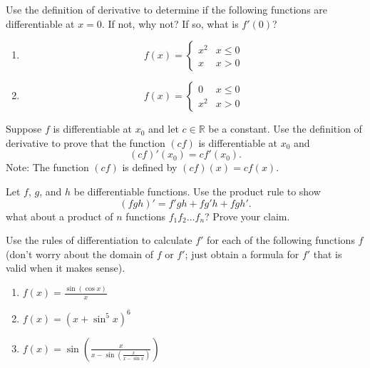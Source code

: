 \documentclass[12pt,letterpaper]{hmcpset}
\begin{document}

\begin{problem}[1]
  Use the definition of derivative to determine if the following functions are differentiable at
$x = 0$. If not, why not? If so, what is $f'(0)$?
\begin{enumerate}[label=(\alph*)]
\item \[ f(x) =
    \begin{cases}
      x^2 &x \leq 0 \\
      x   &x > 0
    \end{cases}
  \]
\item \[ f(x) =
    \begin{cases}
    0 &x \leq 0 \\
    x^2 &x > 0
    \end{cases}
    \]
\end{enumerate}
\end{problem}
\begin{solution}

\end{solution}
\pagebreak
\begin{problem}[2]
  Suppose $f$ is differentiable at $x_0$ and let $c\in\mathbb{R}$ be a constant. Use the definition of derivative to prove that the function $(cf)$ is differentiable at $x_0$ and
  \[ (cf)' (x_0) = cf'(x_0). \]
  Note: The function $(cf)$ is defined by $(cf)(x) = cf(x)$.
\end{problem}
\begin{solution}

\end{solution}
\pagebreak
\begin{problem}[3]
  Let $f$, $g$, and $h$ be differentiable functions. Use the product rule to show
  \[ (fgh)' = f'gh + fg'h + fgh'. \]
  what about a product of $n$ functions $f_1f_2\dots f_n$? Prove your claim.
\end{problem}
\begin{solution}
  
\end{solution}
\pagebreak
\begin{problem}[4]
  Use the rules of differentiation to calculate $f'$ for each of the following functions $f$ (don’t worry about the domain of $f$ or $f'$; just obtain a formula for $f'$ that is valid when it makes sense).
  \begin{enumerate}[label=(\alph*)]
  \item $\displaystyle f(x) = \frac{\sin(\cos x)}{x}$
  \item $\displaystyle f(x) = \left(x + \sin^5 x\right)^6$
  \item $\displaystyle f(x) = \sin\left( \frac{x}{x - \sin\left( \frac{x}{x-\sin x}\right)} \right)$
  \end{enumerate}
\end{problem}
\end{document}
